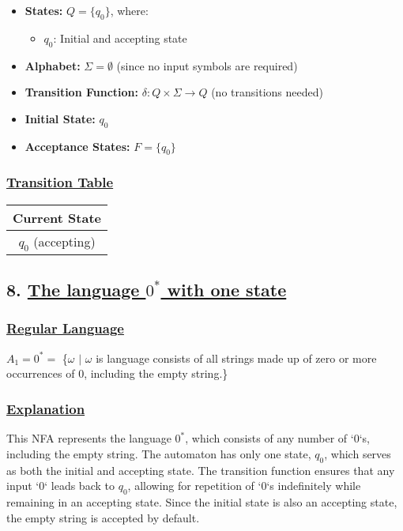 \documentclass[12pt]{article}
\begin{document}
	\begin{itemize}[leftmargin=*] 
		\item \textbf{States:} \(Q = \{q_0\}\), where:
		\begin{itemize} 
			\item \(q_0\): Initial and accepting state 
		\end{itemize} 
		\item \textbf{Alphabet:} \(\Sigma = \emptyset\) (since no input symbols are required)
		\item \textbf{Transition Function:} \(\delta: Q \times \Sigma \to Q\) (no transitions needed)
		\item \textbf{Initial State:} \(q_0\) 
		\item \textbf{Acceptance States:} \(F = \{q_0\}\) 
	\end{itemize} 
	
	\subsubsection*{\underline{Transition Table}} 
	\begin{center} 
		\begin{tabular}{c} 
			\toprule 
			\textbf{Current State} \\ 
			\midrule 
			$q_0$ (accepting) \\ 
			\bottomrule 
		\end{tabular} 
	\end{center} 
	
	
	
	\newpage
	\subsection*{8. \underline{ The language \(0^*\) with one state} } \vspace{2mm} 
	
	\subsubsection*{\underline{Regular Language}} 
	\begin{tcolorbox}[colback=white,colframe=transitioncol,arc=0mm] 
		$A_1 = 0^* =$ \{$\omega$ $|$ $\omega$ is language consists of all strings made up of zero or more occurrences of 0, including the empty string.\}\
	\end{tcolorbox} 
	
	\subsubsection*{\underline{Explanation}} 
	This NFA represents the language \(0^*\), which consists of any number of `0`s, including the empty string. The automaton has only one state, \(q_0\), which serves as both the initial and accepting state. The transition function ensures that any input `0` leads back to \(q_0\), allowing for repetition of `0`s indefinitely while remaining in an accepting state. Since the initial state is also an accepting state, the empty string is accepted by default.
	
\end{document}

